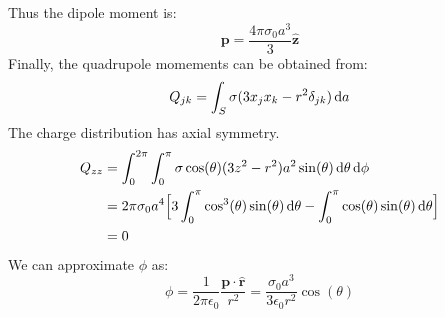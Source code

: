 \begin{solution}
                    Thus the dipole moment is:
                    \begin{equation}
                        \mathbf{p}=
                        \frac{4\pi\sigma_{0}a^{3}}{3}\hat{\mathbf{z}}
                    \end{equation}
                    Finally, the quadrupole momements can be
                    obtained from:
                    \begin{equation}
                        Q_{jk}=\int_{S}\sigma
                            (3x_{j}x_{k}-r^{2}\delta_{jk})\mathop{}\!\mathrm{d}{a}
                    \end{equation}
                    The charge distribution has axial symmetry.
                    \begin{subequations}
                        \begin{align}
                            Q_{zz}&=
                            \int_{0}^{2\pi}\int_{0}^{\pi}
                                \sigma\cos(\theta)
                                (3z^{2}-r^{2})a^{2}\sin(\theta)
                                \mathop{}\!\mathrm{d}{\theta}\mathop{}\!\mathrm{d}{\phi}\\
                            &=2\pi\sigma_{0}a^{4}
                                \Big[3\int_{0}^{\pi}\cos^{3}(\theta)
                                     \sin(\theta)\mathop{}\!\mathrm{d}{\theta}-
                                     \int_{0}^{\pi}\cos(\theta)
                                     \sin(\theta)\mathop{}\!\mathrm{d}{\theta}\Big]\\
                            &=0
                        \end{align}
                    \end{subequations}
                    We can approximate $\phi$ as:
                    \begin{equation}
                        \phi=\frac{1}{2\pi\epsilon_{0}}
                            \frac{\mathbf{p}\cdot\hat{\mathbf{r}}}{r^{2}}
                            =\frac{\sigma_{0}a^{3}}{3\epsilon_{0}r^{2}}
                                \cos(\theta)
                    \end{equation}
                \end{solution}
